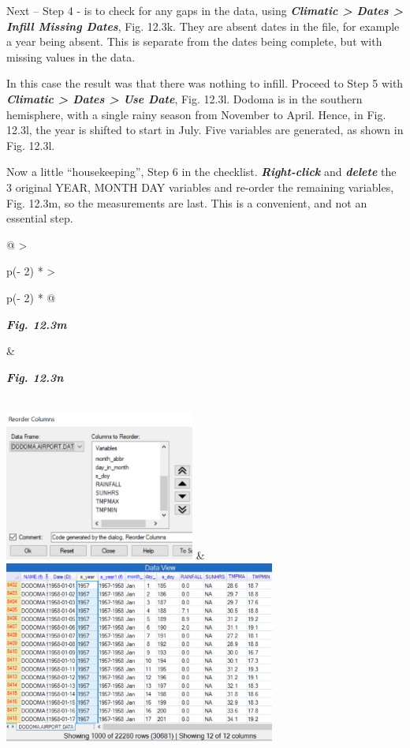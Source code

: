 \documentclass[
  letterpaper,
  DIV=11,
  numbers=noendperiod]{scrreprt}
\begin{document}
Next -- Step 4 - is to check for any gaps in the data, using
\textbf{\emph{Climatic \textgreater{} Dates \textgreater{} Infill
Missing Dates}}, Fig. 12.3k. They are absent dates in the file, for
example a year being absent. This is separate from the dates being
complete, but with missing values in the data.

In this case the result was that there was nothing to infill. Proceed to
Step 5 with \textbf{\emph{Climatic \textgreater{} Dates \textgreater{}
Use Date}}, Fig. 12.3l. Dodoma is in the southern hemisphere, with a
single rainy season from November to April. Hence, in Fig. 12.3l, the
year is shifted to start in July. Five variables are generated, as shown
in Fig. 12.3l.

Now a little ``housekeeping'', Step 6 in the checklist.
\textbf{\emph{Right-click}} and \textbf{\emph{delete}} the 3 original
YEAR, MONTH DAY variables and re-order the remaining variables, Fig.
12.3m, so the measurements are last. This is a convenient, and not an
essential step.

\begin{longtable}[]{@{}
  >{\raggedright\arraybackslash}p{(\columnwidth - 2\tabcolsep) * }
  >{\raggedright\arraybackslash}p{(\columnwidth - 2\tabcolsep) * }@{}}
\toprule\noalign{}
\begin{minipage}[b]{\linewidth}\raggedright
\textbf{\emph{Fig. 12.3m}}
\end{minipage} & \begin{minipage}[b]{\linewidth}\raggedright
\textbf{\emph{Fig. 12.3n}}
\end{minipage} \\
\midrule\noalign{}
\endhead
\bottomrule\noalign{}
\endlastfoot
\includegraphics[width=2.45925in,height=1.94968in]{figures/Fig12.3m.png}
&
\includegraphics[width=3.51321in,height=2.35447in]{figures/Fig12.3n.png} \\
\end{longtable}
\end{document}
